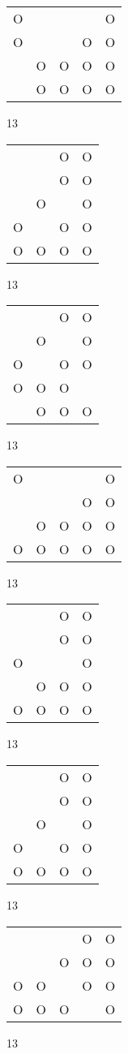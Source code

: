 \begin{tabular}{|m{0.2cm}m{0.2cm}m{0.2cm}m{0.2cm}m{0.2cm}|}\hline
O& & & &O\\
O& & &O&O\\
 &O&O&O&O\\
 &O&O&O&O\\
\hline\end{tabular}13
\begin{tabular}{|m{0.2cm}m{0.2cm}m{0.2cm}m{0.2cm}|}\hline
 & &O&O\\
 & &O&O\\
 &O& &O\\
O& &O&O\\
O&O&O&O\\
\hline\end{tabular}13
\begin{tabular}{|m{0.2cm}m{0.2cm}m{0.2cm}m{0.2cm}|}\hline
 & &O&O\\
 &O& &O\\
O& &O&O\\
O&O&O& \\
 &O&O&O\\
\hline\end{tabular}13
\begin{tabular}{|m{0.2cm}m{0.2cm}m{0.2cm}m{0.2cm}m{0.2cm}|}\hline
O& & & &O\\
 & & &O&O\\
 &O&O&O&O\\
O&O&O&O&O\\
\hline\end{tabular}13
\begin{tabular}{|m{0.2cm}m{0.2cm}m{0.2cm}m{0.2cm}|}\hline
 & &O&O\\
 & &O&O\\
O& & &O\\
 &O&O&O\\
O&O&O&O\\
\hline\end{tabular}13
\begin{tabular}{|m{0.2cm}m{0.2cm}m{0.2cm}m{0.2cm}|}\hline
 & &O&O\\
 & &O&O\\
 &O& &O\\
O& &O&O\\
O&O&O&O\\
\hline\end{tabular}13
\begin{tabular}{|m{0.2cm}m{0.2cm}m{0.2cm}m{0.2cm}m{0.2cm}|}\hline
 & & &O&O\\
 & &O&O&O\\
O&O& &O&O\\
O&O&O& &O\\
\hline\end{tabular}13
